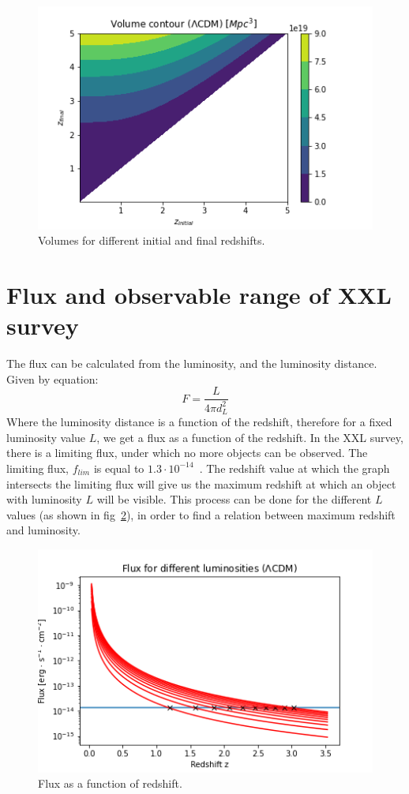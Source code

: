 \documentclass[12pt]{article}
\begin{document}
\begin{figure}[ht]
	\centering
	\includegraphics[width=0.6\linewidth]{volContour.png}
	\caption{Volumes for different initial and final redshifts.}
	\label{fig:volContour}
\end{figure}



\section{Flux and observable range of XXL survey}
The flux can be calculated from the luminosity, and the luminosity distance. Given by equation:
\begin{equation}
	F = \frac{L}{4 \pi d_{L}^{2}}
	\label{eq:flux}
\end{equation}
Where the luminosity distance is a function of the redshift, therefore for a fixed luminosity value $L$, we get a flux as a function of the redshift. In the XXL survey, there is a limiting flux, under which no more objects can be observed. The limiting flux, $f_{lim}$ is equal to $1.3 \cdot 10^{-14}$~\cite{ref:xxlsurvey}. The redshift value at which the graph intersects the limiting flux will give us the maximum redshift at which an object with luminosity $L$ will be visible. This process can be done for the different $L$ values (as shown in fig~\ref{fig:fluxZmax}), in order to find a relation between maximum redshift and luminosity.

\begin{figure}[ht]
	\centering
	\includegraphics[width=0.6\linewidth]{fluxZmax.png}
	\caption{Flux as a function of redshift.}
	\label{fig:fluxZmax}
\end{figure}
\end{document}
